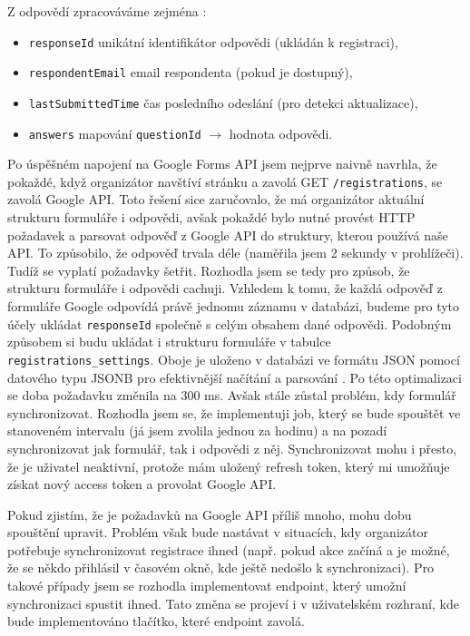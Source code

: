 \noindent
Z odpovědí zpracováváme zejména \cite{google_forms_formresponse}:
\begin{itemize}
    \item \texttt{responseId} \- unikátní identifikátor odpovědi (ukládán k registraci),
    \item \texttt{respondentEmail} \- email respondenta (pokud je dostupný),
    \item \texttt{lastSubmittedTime} \- čas posledního odeslání (pro detekci aktualizace),
    \item \texttt{answers} \- mapování \texttt{questionId} $\rightarrow$ hodnota odpovědi.
\end{itemize}

Po úspěšném napojení na Google Forms API jsem nejprve naivně navrhla, že pokaždé, když organizátor navštíví stránku a zavolá GET \texttt{/registrations}, se zavolá Google API. Toto řešení sice zaručovalo, že má organizátor aktuální strukturu formuláře i odpovědi, avšak pokaždé bylo nutné provést HTTP požadavek a parsovat odpověď z Google API do struktury, kterou používá naše API. To způsobilo, že odpověď trvala déle (naměřila jsem 2 sekundy v prohlížeči). Tudíž se vyplatí požadavky šetřit. Rozhodla jsem se tedy pro způsob, že strukturu formuláře i odpovědi cachuji. Vzhledem k tomu, že každá odpověď z formuláře Google odpovídá právě jednomu záznamu v databázi, budeme pro tyto účely ukládat \texttt{responseId} společně s celým obsahem dané odpovědi. Podobným způsobem si budu ukládat i strukturu formuláře v tabulce \texttt{registrations\_settings}.
Oboje je uloženo v databázi ve formátu JSON pomocí datového typu JSONB pro efektivnější načítání a parsování \cite{dudycz_postgresql_jsonb}. Po této optimalizaci se doba požadavku změnila na 300 ms. Avšak stále zůstal problém, kdy formulář synchronizovat. Rozhodla jsem se, že implementuji job, který se bude spouštět ve stanoveném intervalu (já jsem zvolila jednou za hodinu) a na pozadí synchronizovat jak formulář, tak i odpovědi z něj. Synchronizovat mohu i přesto, že je uživatel neaktivní, protože mám uložený refresh token, který mi umožňuje získat nový access token a provolat Google API.

Pokud zjistím, že je požadavků na Google API příliš mnoho, mohu dobu spouštění upravit. Problém však bude nastávat v situacích, kdy organizátor potřebuje synchronizovat registrace ihned (např. pokud akce začíná a je možné, že se někdo přihlásil v časovém okně, kde ještě nedošlo k synchronizaci). Pro takové případy jsem se rozhodla implementovat endpoint, který umožní synchronizaci spustit ihned. Tato změna se projeví i v uživatelském rozhraní, kde bude implementováno tlačítko, které endpoint zavolá.

